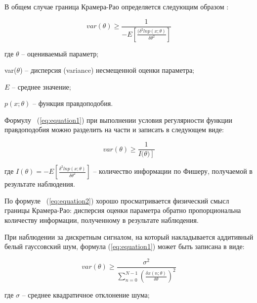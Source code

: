 В общем случае граница Крамера-Рао определяется следующим образом \cite{kay1993fundamentals, kay2013fundamentals}:

\begin{equation}
	\label{eq:equation1}
	var(\theta)\geq\frac{1}{-E\left[\frac{(\delta^2 ln p(x;\theta)}{\delta\theta^2}\right]}
\end{equation}

где $\theta$ -- оцениваемый параметр; 

var($\theta$) -- дисперсия (variance) несмещенной оценки параметра;

$E$ -- среднее значение;

$p(x;\theta)$ -- функция правдоподобия.

Формулу ~(\ref{eq:equation1}) при выполнении условия регулярности функции правдоподобия можно разделить на части и записать в следующем виде:

\begin{equation}
	\label{eq:equation2}
	var(\theta)\geq\frac{1}{I(\left.\theta)\right]}
\end{equation}

где $I(\theta)=-E\left[\frac{\delta^2 ln p(x;\theta)}{\delta\theta^2}\right]$ -- количество информации по Фишеру, получаемой в результате наблюдения.

По формуле ~(\ref{eq:equation2}) хорошо просматривается физический смысл границы Крамера-Рао: дисперсия оценки параметра обратно пропорциональна количеству информации, полученному в результате наблюдения.

При наблюдении за дискретным сигналом, на который накладывается аддитивный белый гауссовский шум, формула (\ref{eq:equation1}) может быть записана в виде: 

\begin{equation}
	\label{eq:equation3}
	var(\theta)\geq\frac{\sigma^2}{\sum_{n=0}^{N-1}\left(\frac{\delta x(n;\theta)}{\delta\theta}\right)^2}
\end{equation}

где $\sigma $ -- среднее квадратичное отклонение шума;

